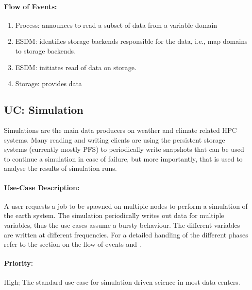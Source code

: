\paragraph{Flow of Events:}
\begin{enumerate}
	\item Process: announces to read a subset of data from a variable domain
	\item ESDM: identifies storage backends responsible for the data, i.e., map domains to storage backends.
	\item ESDM: initiates read of data on storage.
	\item Storage: provides data
\end{enumerate}






\subsection{UC: Simulation}
\label{uc: simulation}

Simulations are the main data producers on weather and climate related HPC systems.
Many reading and writing clients are using the persistent storage systems (currently mostly PFS)  to periodically write snapshots that can be used to continue a simulation in case of failure, but more importantly, that is used to analyse the results of simulation runs.

\paragraph{Use-Case Description:}
A user requests a job to be spawned on multiple nodes to perform a simulation of the earth system.
The simulation periodically writes out data for multiple variables, thus the use cases assume a bursty behaviour.
The different variables are written at different frequencies.
For a detailed handling of the different phases refer to the section on the flow of events and .



\paragraph{Priority:}
High; The standard use-case for simulation driven science in most data centers.

